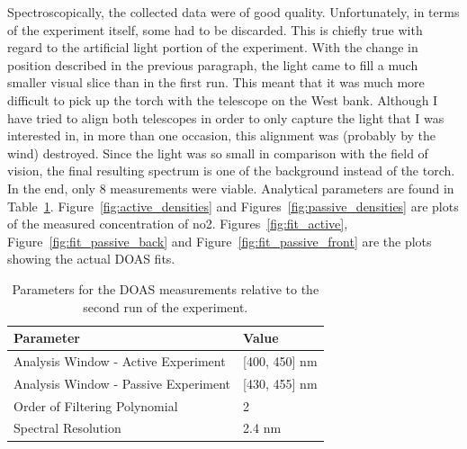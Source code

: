 Spectroscopically, the collected data were of good quality.
Unfortunately, in terms of the experiment itself, some had to be
discarded. This is chiefly true with regard to the artificial light
portion of the experiment. With the change in position described in the
previous paragraph, the light came to fill a much smaller visual slice
than in the first run. This meant that it was much more difficult to
pick up the torch with the telescope on the West bank. Although I have
tried to align both telescopes in order to only capture the light that I
was interested in, in more than one occasion, this alignment was
(probably by the wind) destroyed. Since the light was so small in
comparison with the field of vision, the final resulting spectrum is one
of the background instead of the torch. In the end, only 8 measurements
were viable. Analytical parameters are found in
Table~\ref{tab:doas_parameters}. Figure~\ref{fig:active_densities} and
Figures~\ref{fig:passive_densities} are plots of the measured
concentration of \gls{no2}. Figures~\ref{fig:fit_active},
Figure~\ref{fig:fit_passive_back} and Figure~\ref{fig:fit_passive_front}
are the plots showing the actual \gls{DOAS} fits.

\begin{table}[htpb]
    \centering
    \caption{Parameters for the DOAS measurements relative to the second
    run of the experiment.}
    \label{tab:doas_parameters}
    \begin{tabular}{@{}ll@{}}
        \toprule
        \textbf{Parameter}                   & \textbf{Value}    \\
        \midrule
        Analysis Window - Active Experiment  & {[}400, 450{]} nm \\
        \midrule
        Analysis Window - Passive Experiment & {[}430, 455{]} nm \\
        \midrule
        Order of Filtering Polynomial        & 2                 \\
        \midrule
        Spectral Resolution                  & 2.4 nm           \\
        \bottomrule
    \end{tabular}
\end{table}

